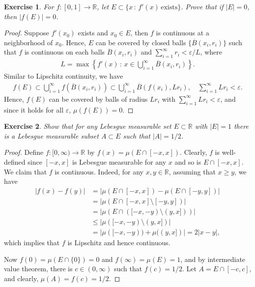 \documentclass[11pt]{book}
\newtheorem{exercise}{Exercise}[section]
\theoremstyle{definition}
\numberwithin{equation}{chapter}
\begin{document}
\medskip

\begin{exercise}
For $f:[0,1] \to \mathbb{R}$, let $E \subset \{x \,:\, f'(x)\, \text{exists}\}$. Prove that if $\left|E\right| = 0$, then $\left|f(E)\right| = 0$.
\end{exercise}
\begin{proof}
Suppose $f'(x_0)$ exists and $x_0 \in E$, then $f$ is continuous at a neighborhood of $x_0$. Hence, $E$ can be covered by closed balls $\{\overline{B}(x_i,r_i)\}$ such that $f$ is continuous on each balls $\overline{B}(x_i,r_i)$ and $\sum^\infty_{i=1} r_i < \varepsilon/L $, where
\begin{align*}
    L = \max \left\{f'(x) \,:\, x \in \bigcup^\infty_{i=1} \overline{B}(x_i,r_i)\right\}.
\end{align*}
Similar to Lipschitz continuity, we have
\begin{align*}
    f(E) \subset \bigcup^\infty_{i=1} f(\overline{B}(x_i,r_i)) \subset \bigcup^\infty_{i=1} \overline{B}(f(x_i),Lr_i) , \quad \sum^\infty_{i=1} Lr_i < \varepsilon.
\end{align*}
Hence, $f(E)$ can be covered by balls of radius $Lr_i$ with $\sum^\infty_{i=1} Lr_i < \varepsilon$, and since it holds for all $\varepsilon$, $\mu(f(E)) = 0$.
\end{proof}

\medskip

\medskip

\begin{exercise}
Show that for any Lebesgue measurable set $E \subset \mathbb{R}$ with $\left|E\right| = 1$ there is a Lebesgue measurable subset $A \subset E$ such that $\left|A\right| = 1/2$.
\end{exercise}
\begin{proof}
Define $f: [0,\infty) \to \mathbb{R}$ by $f(x) = \mu(E \cap [-x,x])$. Clearly, $f$ is well-defined since $[-x,x]$ is Lebesgue measurable for any $x$ and so is $E \cap [-x,x]$. We claim that $f$ is continuous. Indeed, for any $x, y \in \mathbb{R}$, assuming that $x \geq y$, we have
\begin{align*}
    \left|f(x) - f(y)\right| & = \left|\mu(E \cap [-x,x]) - \mu(E \cap [-y,y])\right| \\
    & = \left|\mu(E \cap [-x,x] \setminus [-y,y])\right| \\
    & = \left|\mu(E \cap ([-x,-y) \setminus (y,x]))\right| \\
    & \leq \left|\mu([-x,-y) \setminus (y,x])\right| \\
    & = \left|\mu([-x,-y)) + \mu((y,x])\right| = 2 \left|x - y\right|,
\end{align*}
which implies that $f$ is Lipschitz and hence continuous.

Now $f(0) = \mu(E \cap \{0\}) = 0$ and $f(\infty) = \mu(E) = 1$, and by intermediate value theorem, there is $c \in (0, \infty)$ such that $f(c) = 1/2$. Let $A = E \cap [-c,c]$, and clearly, $\mu(A) = f(c) = 1/2$.
\end{proof}
\end{document}
